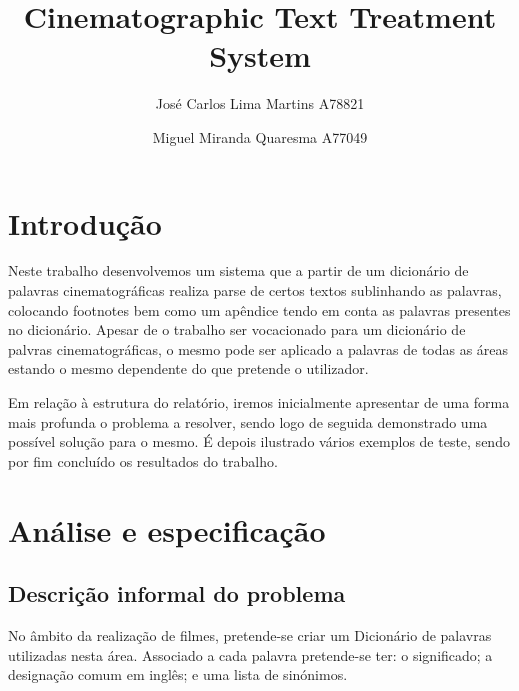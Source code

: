 \documentclass{llncs}
\begin{document}
 \mainmatter
\title{Cinematographic Text Treatment System}
\author{José Carlos Lima Martins A78821 \and
        Miguel Miranda Quaresma A77049}

\maketitle

\justify

\begin{abstract}

\end{abstract}

\section{Introdução}
Neste trabalho desenvolvemos um sistema que a partir de um dicionário de palavras cinematográficas realiza parse de certos textos sublinhando as palavras, colocando footnotes bem como um apêndice tendo em conta as palavras presentes no dicionário. Apesar de o trabalho ser vocacionado para um dicionário de palvras cinematográficas, o mesmo pode ser aplicado a palavras de todas as áreas estando o mesmo dependente do que pretende o utilizador.

Em relação à estrutura do relatório, iremos inicialmente apresentar de uma forma mais profunda o problema a resolver, sendo logo de seguida demonstrado uma possível solução para o mesmo. É depois ilustrado vários exemplos de teste, sendo por fim concluído os resultados do trabalho.

\section{Análise e especificação}

\subsection{Descrição informal do problema}
No âmbito da realização de filmes, pretende-se criar um Dicionário de palavras utilizadas nesta área. Associado a cada palavra pretende-se ter: o significado; a designação comum em inglês; e uma lista de sinónimos.
\end{document}
